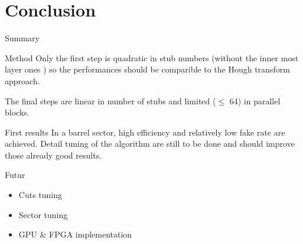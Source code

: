 \documentclass[10pt]{beamer}
\begin{document}
\section{Conclusion}
\begin{frame}[shrink=2]{Summary}
\begin{block}{Method}
Only the first step is quadratic in stub numbers (without the inner most layer ones ) so the performances should
be comparible to the Hough transform approach.
\par
The final steps are linear in number of stubs and limited ($\le$ 64) in parallel blocks. 

\end{block}
\pause
\begin{block}{First results}
In a barrel sector, high efficiency and relatively low fake rate are achieved. Detail tuning of the algorithm are still to be done and should improve those already good results.
\end{block}
\pause
\begin{block}{Futur}
  \begin{itemize}
    \item Cuts tuning
    \item Sector tuning
    \item GPU \& FPGA implementation
  \end{itemize}
\end{block}
\end{frame}
\end{document}
